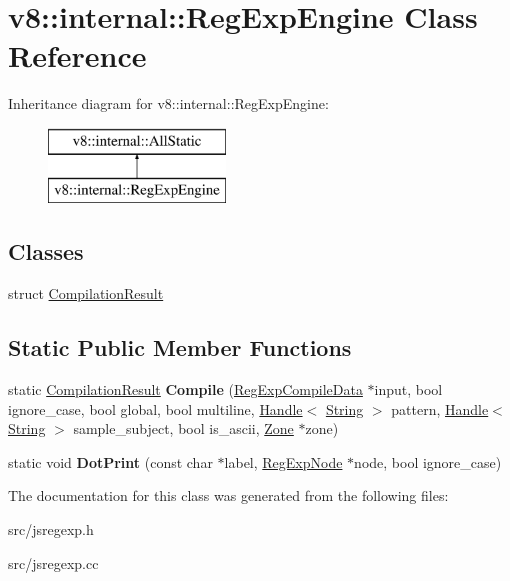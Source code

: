 \hypertarget{classv8_1_1internal_1_1_reg_exp_engine}{}\section{v8\+:\+:internal\+:\+:Reg\+Exp\+Engine Class Reference}
\label{classv8_1_1internal_1_1_reg_exp_engine}
Inheritance diagram for v8\+:\+:internal\+:\+:Reg\+Exp\+Engine\+:\begin{figure}[H]
\begin{center}
\leavevmode
\includegraphics[height=2.000000cm]{classv8_1_1internal_1_1_reg_exp_engine}
\end{center}
\end{figure}
\subsection*{Classes}
\begin{DoxyCompactItemize}
\item 
struct \hyperlink{structv8_1_1internal_1_1_reg_exp_engine_1_1_compilation_result}{Compilation\+Result}
\end{DoxyCompactItemize}
\subsection*{Static Public Member Functions}
\begin{DoxyCompactItemize}
\item 
\hypertarget{classv8_1_1internal_1_1_reg_exp_engine_aa674e5c5825ab4a2a9c6a1b0034a3aa0}{}static \hyperlink{structv8_1_1internal_1_1_reg_exp_engine_1_1_compilation_result}{Compilation\+Result} {\bfseries Compile} (\hyperlink{structv8_1_1internal_1_1_reg_exp_compile_data}{Reg\+Exp\+Compile\+Data} $\ast$input, bool ignore\+\_\+case, bool global, bool multiline, \hyperlink{classv8_1_1internal_1_1_handle}{Handle}$<$ \hyperlink{classv8_1_1internal_1_1_string}{String} $>$ pattern, \hyperlink{classv8_1_1internal_1_1_handle}{Handle}$<$ \hyperlink{classv8_1_1internal_1_1_string}{String} $>$ sample\+\_\+subject, bool is\+\_\+ascii, \hyperlink{classv8_1_1internal_1_1_zone}{Zone} $\ast$zone)\label{classv8_1_1internal_1_1_reg_exp_engine_aa674e5c5825ab4a2a9c6a1b0034a3aa0}

\item 
\hypertarget{classv8_1_1internal_1_1_reg_exp_engine_abcda5d365182e49c9cd24569efb13d7b}{}static void {\bfseries Dot\+Print} (const char $\ast$label, \hyperlink{classv8_1_1internal_1_1_reg_exp_node}{Reg\+Exp\+Node} $\ast$node, bool ignore\+\_\+case)\label{classv8_1_1internal_1_1_reg_exp_engine_abcda5d365182e49c9cd24569efb13d7b}

\end{DoxyCompactItemize}


The documentation for this class was generated from the following files\+:\begin{DoxyCompactItemize}
\item 
src/jsregexp.\+h\item 
src/jsregexp.\+cc\end{DoxyCompactItemize}
